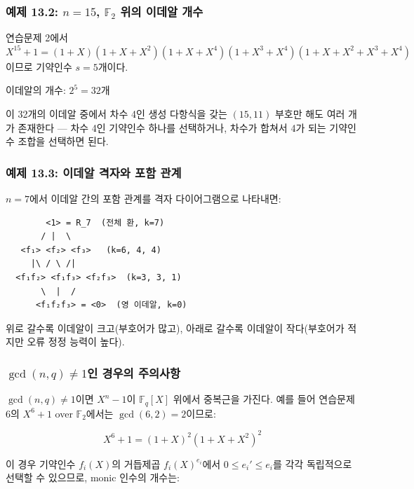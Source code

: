 \documentclass[
  oneside]{article}
\begin{document}
\subsubsection{\texorpdfstring{예제 13.2: \(n = 15\), \(\mathbb{F}_2\)
위의 이데알
개수}{예제 13.2: n = 15, \textbackslash mathbb\{F\}\_2 위의 이데알 개수}}\label{uxc608uxc81c-13.2-n-15-mathbbf_2-uxc704uxc758-uxc774uxb370uxc54c-uxac1cuxc218}

연습문제 2에서
\(X^{15} + 1 = (1+X)(1+X+X^2)(1+X+X^4)(1+X^3+X^4)(1+X+X^2+X^3+X^4)\)이므로
기약인수 \(s = 5\)개이다.

이데알의 개수: \(2^5 = 32\)개

이 32개의 이데알 중에서 차수 4인 생성 다항식을 갖는 \((15, 11)\) 부호만
해도 여러 개가 존재한다 --- 차수 4인 기약인수 하나를 선택하거나, 차수가
합쳐서 4가 되는 기약인수 조합을 선택하면 된다.

\subsubsection{예제 13.3: 이데알 격자와 포함
관계}\label{uxc608uxc81c-13.3-uxc774uxb370uxc54c-uxaca9uxc790uxc640-uxd3ecuxd568-uxad00uxacc4}

\(n = 7\)에서 이데알 간의 포함 관계를 격자 다이어그램으로 나타내면:

\begin{verbatim}
        <1> = R_7  (전체 환, k=7)
       / |  \
   <f₁> <f₂> <f₃>   (k=6, 4, 4)
     |\ / \ /|
  <f₁f₂> <f₁f₃> <f₂f₃>  (k=3, 3, 1)
       \  |  /
      <f₁f₂f₃> = <0>  (영 이데알, k=0)
\end{verbatim}

위로 갈수록 이데알이 크고(부호어가 많고), 아래로 갈수록 이데알이
작다(부호어가 적지만 오류 정정 능력이 높다).

\subsubsection{\texorpdfstring{\(\gcd(n, q) \neq 1\)인 경우의
주의사항}{\textbackslash gcd(n, q) \textbackslash neq 1인 경우의 주의사항}}\label{gcdn-q-neq-1uxc778-uxacbduxc6b0uxc758-uxc8fcuxc758uxc0acuxd56d}

\(\gcd(n, q) \neq 1\)이면 \(X^n - 1\)이 \(\mathbb{F}_q[X]\) 위에서
중복근을 가진다. 예를 들어 연습문제 6의 \(X^6 + 1\) over
\(\mathbb{F}_2\)에서는 \(\gcd(6, 2) = 2\)이므로:

\[X^6 + 1 = (1 + X)^2 (1 + X + X^2)^2\]

이 경우 기약인수 \(f_i(X)\)의 거듭제곱 \(f_i(X)^{e_i}\)에서
\(0 \leq e_i' \leq e_i\)를 각각 독립적으로 선택할 수 있으므로, monic
인수의 개수는:
\end{document}

